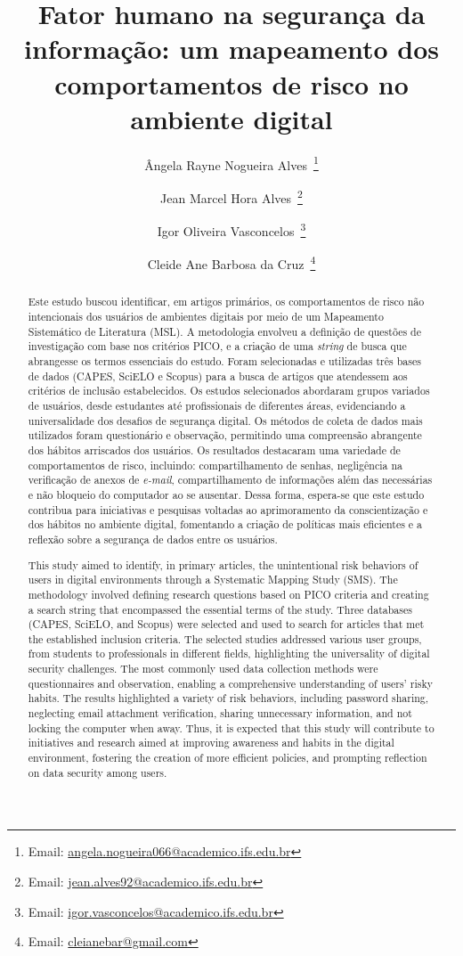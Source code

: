 \documentclass[portuguese]{textolivre}
\title{Fator humano na segurança da informação: um mapeamento dos comportamentos de risco no ambiente digital}
\author[1]{Ângela Rayne Nogueira Alves~\orcid{0009-0009-7929-7559}\thanks{Email: \href{mailto:angela.nogueira066@academico.ifs.edu.br}{angela.nogueira066@academico.ifs.edu.br}}}
\author[1]{Jean Marcel Hora Alves~\orcid{0009-0007-1766-7185}\thanks{Email: \href{mailto:jean.alves92@academico.ifs.edu.br}{jean.alves92@academico.ifs.edu.br}}}
\author[1]{Igor Oliveira Vasconcelos~\orcid{0000-0001-6497-1007}\thanks{Email: \href{mailto:igor.vasconcelos@academico.ifs.edu.br}{igor.vasconcelos@academico.ifs.edu.br}}}
\author[2]{Cleide Ane Barbosa da Cruz~\orcid{0000-0002-8277-1460}\thanks{Email: \href{mailto:cleianebar@gmail.com}{cleianebar@gmail.com}}}
\affil[1]{Instituto Federal de Educação, Ciência e Tecnologia de Sergipe, Propriá, SE, Brasil.}
\affil[2]{Centro Universitário Estácio de Sergipe/ Instituto Federal de Educação, Ciência e Tecnologia de Sergipe, SE, Brasil.}
\begin{document}
\maketitle
\begin{polyabstract}
\begin{abstract}
Este estudo buscou identificar, em artigos primários, os comportamentos de risco não intencionais dos usuários de ambientes digitais por meio de um Mapeamento Sistemático de Literatura (MSL). A metodologia envolveu a definição de questões de investigação com base nos critérios PICO, e a criação de uma \textit{string} de busca que abrangesse os termos essenciais do estudo. Foram selecionadas e utilizadas três bases de dados (CAPES, SciELO e Scopus) para a busca de artigos que atendessem aos critérios de inclusão estabelecidos. Os estudos selecionados abordaram grupos variados de usuários, desde estudantes até profissionais de diferentes áreas, evidenciando a universalidade dos desafios de segurança digital. Os métodos de coleta de dados mais utilizados foram questionário e observação, permitindo uma compreensão abrangente dos hábitos arriscados dos usuários. Os resultados destacaram uma variedade de comportamentos de risco, incluindo: compartilhamento de senhas, negligência na verificação de anexos de \textit{e-mail}, compartilhamento de informações além das necessárias e não bloqueio do computador ao se ausentar. Dessa forma, espera-se que este estudo contribua para iniciativas e pesquisas voltadas ao aprimoramento da conscientização e dos hábitos no ambiente digital, fomentando a criação de políticas mais eficientes e a reflexão sobre a segurança de dados entre os usuários.

\end{abstract}

\begin{english}
\begin{abstract}
This study aimed to identify, in primary articles, the unintentional risk behaviors of users in digital environments through a Systematic Mapping Study (SMS). The methodology involved defining research questions based on PICO criteria and creating a search string that encompassed the essential terms of the study. Three databases (CAPES, SciELO, and Scopus) were selected and used to search for articles that met the established inclusion criteria. The selected studies addressed various user groups, from students to professionals in different fields, highlighting the universality of digital security challenges. The most commonly used data collection methods were questionnaires and observation, enabling a comprehensive understanding of users' risky habits. The results highlighted a variety of risk behaviors, including password sharing, neglecting email attachment verification, sharing unnecessary information, and not locking the computer when away. Thus, it is expected that this study will contribute to initiatives and research aimed at improving awareness and habits in the digital environment, fostering the creation of more efficient policies, and prompting reflection on data security among users.


\end{abstract}
\end{english}
\end{polyabstract}
\end{document}

